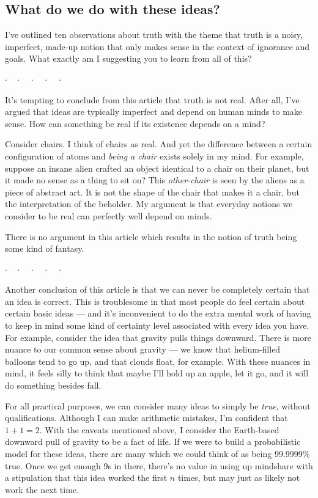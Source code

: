 \documentclass[11pt, oneside]{article}   	%
\newcommand{\dotq}{\cdot\quad}
\newcommand{\scenebreak}{
    \medskip\centerline{$\dotq\dotq\dotq\dotq\cdot$}\medskip
}
\begin{document}
\subsection{What do we do with these ideas?}

I've outlined ten observations about truth with the theme that
truth is a noisy, imperfect, made-up notion that only makes sense in the context
of ignorance and goals. What exactly am I suggesting you to learn from all of
this?

\scenebreak

It's tempting to conclude from this article that truth is not real.
After all, I've argued that ideas are typically imperfect and depend on
human minds to make sense. How can something be real if its existence depends on
a mind?

Consider chairs. I think of chairs as real. And yet the difference between a
certain configuration of atoms and {\em being a chair} exists solely in my mind.
For example, suppose an insane alien crafted an object identical to a chair on
their planet, but it made no sense as a thing to sit on? This {\em other-chair}
is seen by the aliens as a piece of abstract art. It is not the shape of the
chair that makes it a chair, but the interpretation of the beholder.
My argument is that everyday notions we consider to be real can perfectly well
depend on minds.

There is no argument in this article which results in the notion of truth being
some kind of fantasy.

\scenebreak

Another conclusion of this article is that we can never be completely certain
that an idea is correct.
This is troublesome in that most people do feel certain about certain basic
ideas --- and it's inconvenient to do the extra mental work of having to keep in
mind some kind of certainty level associated with every idea you have.
For example, consider the idea that gravity pulls things downward.
There is more nuance to our common sense about gravity --- we know that
helium-filled balloons tend to go up, and that clouds float, for example.
With these nuances in mind, it feels silly to think that maybe I'll hold up an
apple, let it go, and it will do something besides fall.

For all practical purposes, we can consider many ideas to simply be {\em true},
without qualifications. Although I can make arithmetic mistakes, I'm confident
that $1+1=2$. With the caveats mentioned above, I consider the Earth-based
downward pull of gravity to be a fact of life. If we were to build a
probabilistic model for these ideas, there are many which we could think of as
being 99.9999\% true. Once we get enough 9s in there,
there's no value in using up mindshare with a stipulation that this idea worked
the first $n$ times, but may just as likely not work the next time.
\end{document}
